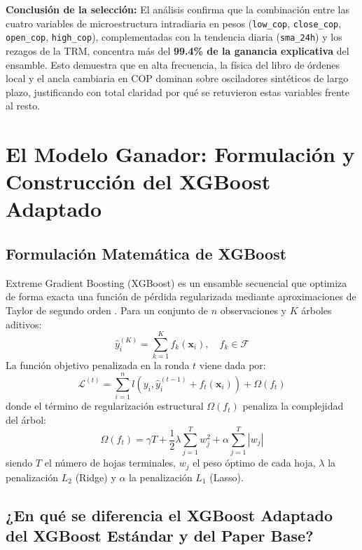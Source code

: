 \documentclass[12pt,letterpaper]{article}
\begin{document}
\textbf{Conclusión de la selección:} El análisis confirma que la combinación entre las cuatro variables de microestructura intradiaria en pesos (\texttt{low\_cop}, \texttt{close\_cop}, \texttt{open\_cop}, \texttt{high\_cop}), complementadas con la tendencia diaria (\texttt{sma\_24h}) y los rezagos de la TRM, concentra más del \textbf{99.4\% de la ganancia explicativa} del ensamble. Esto demuestra que en alta frecuencia, la física del libro de órdenes local y el ancla cambiaria en COP dominan sobre osciladores sintéticos de largo plazo, justificando con total claridad por qué se retuvieron estas variables frente al resto.

\section{El Modelo Ganador: Formulación y Construcción del XGBoost Adaptado}

\subsection{Formulación Matemática de XGBoost}
Extreme Gradient Boosting (XGBoost) es un ensamble secuencial que optimiza de forma exacta una función de pérdida regularizada mediante aproximaciones de Taylor de segundo orden \cite{chen2016xgboost}. Para un conjunto de $n$ observaciones y $K$ árboles aditivos:
\begin{equation}
\hat{y}_i^{(K)} = \sum_{k=1}^K f_k(\mathbf{x}_i), \quad f_k \in \mathcal{F}
\end{equation}
La función objetivo penalizada en la ronda $t$ viene dada por:
\begin{equation}
\mathcal{L}^{(t)} = \sum_{i=1}^n l\left(y_i, \hat{y}_i^{(t-1)} + f_t(\mathbf{x}_i)\right) + \Omega(f_t)
\end{equation}
donde el término de regularización estructural $\Omega(f_t)$ penaliza la complejidad del árbol:
\begin{equation}
\Omega(f_t) = \gamma T + \frac{1}{2} \lambda \sum_{j=1}^T w_j^2 + \alpha \sum_{j=1}^T |w_j|
\end{equation}
siendo $T$ el número de hojas terminales, $w_j$ el peso óptimo de cada hoja, $\lambda$ la penalización $L_2$ (Ridge) y $\alpha$ la penalización $L_1$ (Lasso).

\subsection{¿En qué se diferencia el XGBoost Adaptado del XGBoost Estándar y del Paper Base?}
\end{document}
